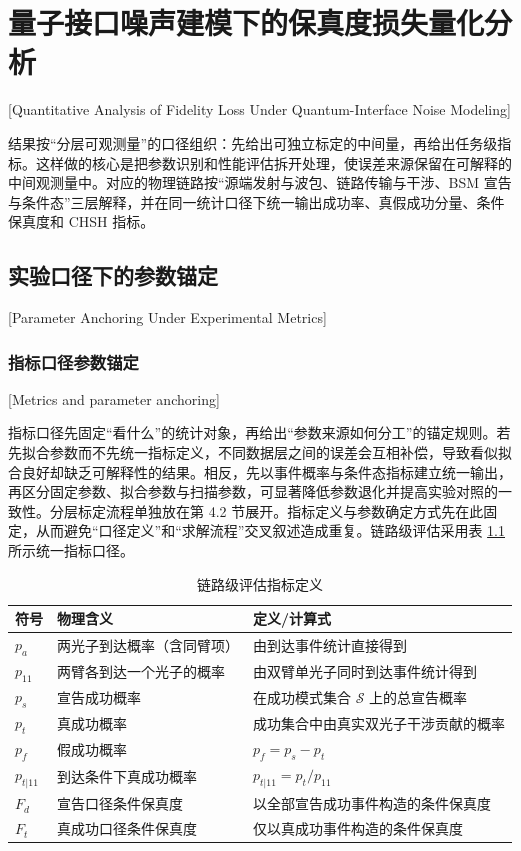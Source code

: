 ﻿

\chapter{量子接口噪声建模下的保真度损失量化分析}[Quantitative Analysis of Fidelity Loss Under Quantum-Interface Noise Modeling]

结果按“分层可观测量”的口径组织：先给出可独立标定的中间量，再给出任务级指标。这样做的核心是把参数识别和性能评估拆开处理，使误差来源保留在可解释的中间观测量中。对应的物理链路按“源端发射与波包、链路传输与干涉、BSM 宣告与条件态”三层解释，并在同一统计口径下统一输出成功率、真假成功分量、条件保真度和 CHSH 指标。

\section{实验口径下的参数锚定}[Parameter Anchoring Under Experimental Metrics]

\subsection{指标口径参数锚定}[Metrics and parameter anchoring]

指标口径先固定“看什么”的统计对象，再给出“参数来源如何分工”的锚定规则。若先拟合参数而不先统一指标定义，不同数据层之间的误差会互相补偿，导致看似拟合良好却缺乏可解释性的结果。相反，先以事件概率与条件态指标建立统一输出，再区分固定参数、拟合参数与扫描参数，可显著降低参数退化并提高实验对照的一致性。分层标定流程单独放在第 4.2 节展开。指标定义与参数确定方式先在此固定，从而避免“口径定义”和“求解流程”交叉叙述造成重复。链路级评估采用表 \ref{tab:metric-def} 所示统一指标口径。
\begin{table}[htbp]
\centering
\caption{链路级评估指标定义}
\label{tab:metric-def}
\begin{tabularx}{0.98\linewidth}{l X X}
\toprule
符号 & 物理含义 & 定义/计算式 \\
\midrule
$p_a$ & 两光子到达概率（含同臂项） & 由到达事件统计直接得到 \\
$p_{11}$ & 两臂各到达一个光子的概率 & 由双臂单光子同时到达事件统计得到 \\
$p_s$ & 宣告成功概率 & 在成功模式集合 $\mathcal{S}$ 上的总宣告概率 \\
$p_t$ & 真成功概率 & 成功集合中由真实双光子干涉贡献的概率 \\
$p_f$ & 假成功概率 & $p_f=p_s-p_t$ \\
$p_{t|11}$ & 到达条件下真成功概率 & $p_{t|11}=p_t/p_{11}$ \\
$F_d$ & 宣告口径条件保真度 & 以全部宣告成功事件构造的条件保真度 \\
$F_t$ & 真成功口径条件保真度 & 仅以真成功事件构造的条件保真度 \\
\bottomrule
\end{tabularx}
\end{table}


